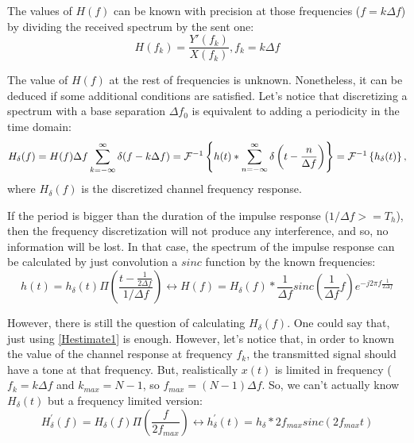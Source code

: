 The values of $H(f)$ can be known with precision at those frequencies ($f = k \Delta f$) by dividing the received spectrum by the sent one:
\begin{equation}
H(f_k) = \frac{Y'(f_k)}{X(f_k)}, f_k = k \Delta f
\label{Hestimate1}
\end{equation}

The value of $H(f)$ at the rest of frequencies is unknown. Nonetheless, it can be deduced if some additional conditions are satisfied. Let's notice that discretizing a spectrum with a base separation $\Delta f_0$ is equivalent to adding a periodicity in the time domain:
\begin{equation}
H_\delta(f) = H(f) \Delta f \sum_{k = -\infty}^{\infty} \delta(f - k \Delta f) = \FourierTransform{h(t) \ast \sum_{n = -\infty}^{\infty} \delta\left(t - \frac{n}{\Delta f}\right)}[inverse] = \FourierTransform{h_\delta(t)}[inverse],
\end{equation}
where $H_\delta(f)$ is the discretized channel frequency response.

If the period is bigger than the duration of the impulse response ($1/\Delta f >= T_h$), then the frequency discretization will not produce any interference, and so, no information will be lost. In that case, the spectrum of the impulse response can be calculated by just convolution a $\mathit{sinc}$ function by the known frequencies:
\begin{equation}
h(t) = h_\delta(t) \Pi\left( \frac{t - \frac{1}{2\Delta f}}{1/\Delta f} \right) \leftrightarrow
H(f) = H_\delta(f) \ast \frac{1}{\Delta f} \mathit{sinc}\left( \frac{1}{\Delta f} f \right) e^{-j 2 \pi f \frac{1}{2 \Delta f}}
\end{equation}

However, there is still the question of calculating $H_\delta(f)$. One could say that, just using \autoref{Hestimate1} is enough. However, let's notice that, in order to known the value of the channel response at frequency $f_k$, the transmitted signal should have a tone at that frequency. But, realistically $x(t)$ is limited in frequency ($f_k = k\Delta f$ and $k_{max} = N - 1$, so $f_\mathit{max} = (N-1)\Delta f$. So, we can't actually know $H_\delta(t)$ but a frequency limited version:
\begin{equation}
H_\delta^{'}(f) = H_\delta(f) \Pi\left(\frac{f}{2 f_\mathit{max}}\right) \leftrightarrow h_\delta^{'}(t) = h_\delta \ast 2f_\mathit{max} \mathit{sinc}\left(  2f_\mathit{max} t \right)
\label{frequencyCut}
\end{equation}

